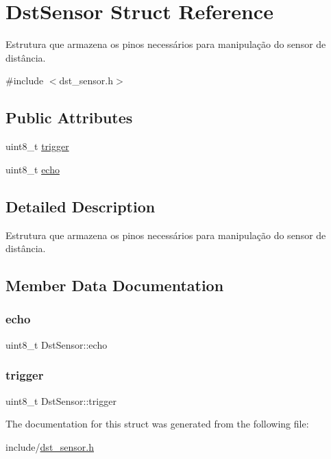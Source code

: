 \hypertarget{struct_dst_sensor}{}\section{Dst\+Sensor Struct Reference}
\label{struct_dst_sensor}


Estrutura que armazena os pinos necessários para manipulação do sensor de distância.  




{\ttfamily \#include $<$dst\+\_\+sensor.\+h$>$}

\subsection*{Public Attributes}
\begin{DoxyCompactItemize}
\item 
uint8\+\_\+t \mbox{\hyperlink{struct_dst_sensor_ae328ec33ec4922371de944665ae70e32}{trigger}}
\item 
uint8\+\_\+t \mbox{\hyperlink{struct_dst_sensor_a3cfb414373760bdebafc967cc9e3778e}{echo}}
\end{DoxyCompactItemize}


\subsection{Detailed Description}
Estrutura que armazena os pinos necessários para manipulação do sensor de distância. 

\subsection{Member Data Documentation}
\mbox{\label{struct_dst_sensor_a3cfb414373760bdebafc967cc9e3778e}} 
\subsubsection{\texorpdfstring{echo}{echo}}
{\footnotesize\ttfamily uint8\+\_\+t Dst\+Sensor\+::echo}

\mbox{\label{struct_dst_sensor_ae328ec33ec4922371de944665ae70e32}} 
\subsubsection{\texorpdfstring{trigger}{trigger}}
{\footnotesize\ttfamily uint8\+\_\+t Dst\+Sensor\+::trigger}



The documentation for this struct was generated from the following file\+:\begin{DoxyCompactItemize}
\item 
include/\mbox{\hyperlink{dst__sensor_8h}{dst\+\_\+sensor.\+h}}\end{DoxyCompactItemize}
